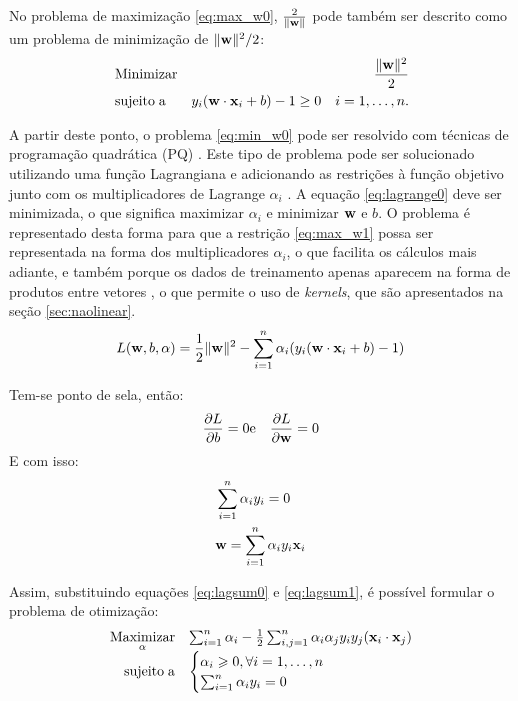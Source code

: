 No problema de maximização \ref{eq:max_w0}, $\frac{2}{\lVert \mathbf{w} \rVert}$ pode também ser descrito como um problema de minimização de $\lVert \mathbf{w} \rVert^2/{2}$:
\begin{eqnarray}
& \label{eq:min_w0}\operatorname{Minimizar} & \frac{\lVert \mathbf{w} \rVert^2}{2} \\
& \nonumber \operatorname{sujeito\;a} & y_i(\mathbf{w}\cdot\mathbf{x}_i + b) - 1 \ge 0 \quad i = 1,\dotsc,n.
\end{eqnarray}

A partir deste ponto, o problema \ref{eq:min_w0} pode ser resolvido com técnicas de programação quadrática (PQ) \cite{osuna1997support}. Este tipo de problema pode ser solucionado utilizando uma função Lagrangiana e adicionando as restrições à função objetivo junto com os multiplicadores de Lagrange $\alpha_i$ \cite{smola2000advances}. A equação \ref{eq:lagrange0} deve ser minimizada, o que significa maximizar $\alpha_i$ e minimizar $\mathbf{w}$ e $b$. O problema é representado desta forma para que a restrição \ref{eq:max_w1} possa ser representada na forma dos multiplicadores $\alpha_i$, o que facilita os cálculos mais adiante, e também porque os dados de treinamento apenas aparecem na forma de produtos entre vetores \cite{burges1998tutorial}, o que permite o uso de \emph{kernels}, que são apresentados na seção \ref{sec:naolinear}.
\begin{equation}\label{eq:lagrange0}
  L(\mathbf{w}, b, \mathbf{\alpha}) = \frac{1}{2}\lVert \mathbf{w} \rVert^2 - 
       \sum_{i=1}^n{\alpha_i(y_i(\mathbf{w}\cdot\mathbf{x}_i + b) - 1)}
\end{equation}

Tem-se ponto de sela, então:
\begin{eqnarray}\label{eq:sela}
  \frac{\partial{L}}{\partial{b}} = 0 & \text{e} & \frac{\partial{L}}{\partial{\mathbf{w}}} = 0
\end{eqnarray}
E com isso:
\begin{eqnarray}
&  \label{eq:lagsum0}  \sum_{i=1}^n{\alpha_i y_i} = 0 \\
&  \label{eq:lagsum1}  \mathbf{w} = \sum_{i=1}^n{\alpha_i y_i\mathbf{x}_i}
\end{eqnarray}

Assim, substituindo equações \ref{eq:lagsum0} e \ref{eq:lagsum1}, é possível formular o problema de otimização:
\begin{eqnarray}\label{eq:maxalpha}
\begin{array}{rl}
   \underset{\alpha}{\operatorname{Maximizar}}
   & \sum_{i=1}^n{\alpha_i - \frac{1}{2}}
                            \sum_{i,j=1}^n{\alpha_i\alpha_j y_i y_j(\mathbf{x}_i\cdot\mathbf{x}_j)} \\
\operatorname{sujeito\;a} &
  \begin{cases}
    \alpha_i \geqslant 0, \forall{i} = 1,\dotsc,n \\
    \sum_{i=1}^n{\alpha_i y_i} = 0
  \end{cases}
\end{array}
\end{eqnarray}

